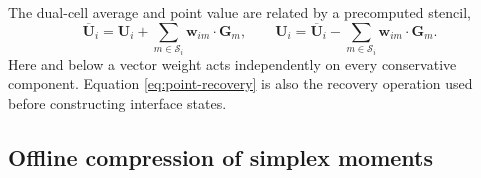 \documentclass[11pt]{article}
\newcommand{\U}{\bm{U}}
\begin{document}
The dual-cell average and point value are related by a precomputed stencil,
\begin{equation}
 \overline{\U}_i=\U_i+\sum_{m\in\mathcal{S}_i}\bm w_{im}\cdot\bm G_m,
 \qquad
 \U_i=\overline{\U}_i-\sum_{m\in\mathcal{S}_i}\bm w_{im}\cdot\bm G_m.
 \label{eq:point-recovery}
\end{equation}
Here and below a vector weight acts independently on every conservative component.  Equation \eqref{eq:point-recovery} is also the recovery operation used before constructing interface states.

\subsection{Offline compression of simplex moments}\label{sec:differential}
\end{document}
